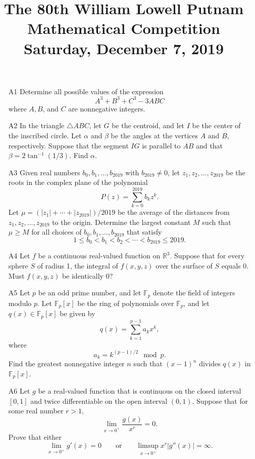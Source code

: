 \documentclass[amssymb,twocolumn,pra,10pt,aps]{revtex4-1}
\begin{document}
\title{The 80th William Lowell Putnam Mathematical Competition \\
    Saturday, December 7, 2019}
\maketitle

\begin{itemize}

\item[A1]
Determine all possible values of the expression
\[
A^3+B^3+C^3-3ABC
\]
where $A, B$, and $C$ are nonnegative integers.

\item[A2]
In the triangle $\triangle ABC$, let $G$ be the centroid, and let $I$ be the center of the inscribed circle.
Let $\alpha$ and $\beta$ be the angles at the vertices $A$ and $B$, respectively.
Suppose that the segment $IG$ is parallel to $AB$ and that $\beta = 2 \tan^{-1} (1/3)$. Find $\alpha$.

\item[A3]
Given real numbers $b_0, b_1, \dots, b_{2019}$ with $b_{2019} \neq 0$, let $z_1,z_2,\dots,z_{2019}$ be 
the roots in the complex plane of the polynomial 
\[
P(z) = \sum_{k=0}^{2019} b_k z^k.
\]
Let $\mu = (|z_1| + \cdots + |z_{2019}|)/2019$ be the average of the distances from $z_1,z_2,\dots,z_{2019}$ to the origin. Determine the largest constant $M$ such that $\mu \geq M$ for all choices of $b_0,b_1,\dots, b_{2019}$ that satisfy
\[
1 \leq b_0 < b_1 < b_2 < \cdots < b_{2019} \leq 2019.
\]

\item[A4]
Let $f$ be a continuous real-valued function on $\mathbb{R}^3$. Suppose that for every sphere $S$ of radius 1,
the integral of $f(x,y,z)$ over the surface of $S$ equals 0. Must $f(x,y,z)$ be identically 0?
 
\item[A5]
Let $p$ be an odd prime number, and let $\mathbb{F}_p$ denote the field of integers modulo $p$. Let $\mathbb{F}_p[x]$ be the ring of polynomials over $\mathbb{F}_p$, and let $q(x) \in \mathbb{F}_p[x]$ be given by 
\[
q(x) = \sum_{k=1}^{p-1} a_k x^k,
\]
where
\[
a_k = k^{(p-1)/2} \mod{p}. 
\]
Find the greatest nonnegative integer $n$ such that $(x-1)^n$ divides $q(x)$ in $\mathbb{F}_p[x]$.

\item[A6] 
Let $g$ be a real-valued function that is continuous on the closed interval $[0,1]$ and twice differentiable on 
the open interval $(0,1)$. Suppose that for some real number $r>1$, 
\[
\lim_{x \to 0^+} \frac{g(x)}{x^r} = 0.
\]
Prove that either
\[
\lim_{x \to 0^+} g'(x) = 0 \qquad \mbox{or} \qquad \limsup_{x \to 0^+} x^r |g''(x)| = \infty.
\]


\end{itemize}
\end{document}
